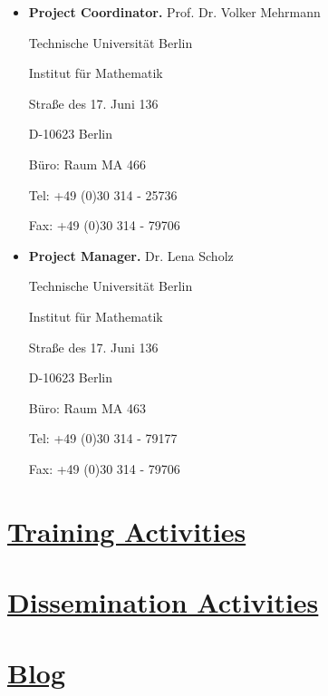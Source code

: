 \documentclass[onsided]{book}
\numberwithin{equation}{section}
\begin{document}
\begin{itemize}
    \item \textbf{Project Coordinator.} Prof. Dr. Volker Mehrmann
    
    Technische Universität Berlin
    
    Institut für Mathematik
    
    Straße des 17. Juni 136
    
    D-10623 Berlin
    
    Büro: Raum MA 466
    
    Tel: +49 (0)30 314 - 25736
    
    Fax: +49 (0)30 314 - 79706
    \item \textbf{Project Manager.} Dr. Lena Scholz
    
    Technische Universität Berlin
    
    Institut für Mathematik
    
    Straße des 17. Juni 136
    
    D-10623 Berlin
    
    Büro: Raum MA 463
    
    Tel: +49 (0)30 314 - 79177
    
    Fax: +49 (0)30 314 - 79706
\end{itemize}


\chapter{\href{https://www.romsoc.eu/205-2/}{Training Activities}}


\chapter{\href{https://www.romsoc.eu/dissemination/}{Dissemination Activities}}


\chapter{\href{https://www.romsoc.eu/blog/}{Blog}}

\end{document}
